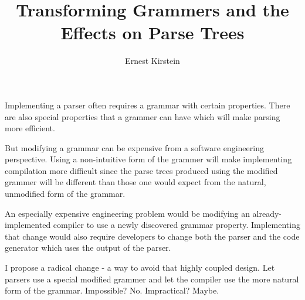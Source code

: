\documentclass[11pt]{article}
\begin{document}
\title{Transforming Grammers and the Effects on Parse Trees}
\author{Ernest Kirstein}
\maketitle

Implementing a parser often requires a grammar with certain properties.
\cite{lewis, compiler}
There are also special properties that a grammer can have which will make
parsing more efficient. \cite{compiler, reghizzi}

But modifying a grammar can be expensive from a software engineering perspective.
Using a non-intuitive form of the grammer will make implementing compilation 
more difficult since the parse trees produced using the modified grammer will
be different than those one would expect from the natural, unmodified form of the
grammar.

An especially expensive engineering problem would be modifying an already-implemented
compiler to use a newly discovered grammar property. Implementing that change
would also require developers to change both the parser and the code generator
which uses the output of the parser.

I propose a radical change - a way to avoid that highly coupled design. Let parsers
use a special modified grammer and let the compiler use the more natural form of
the grammar. Impossible? No. Impractical? Maybe.

{}

\end{document}
